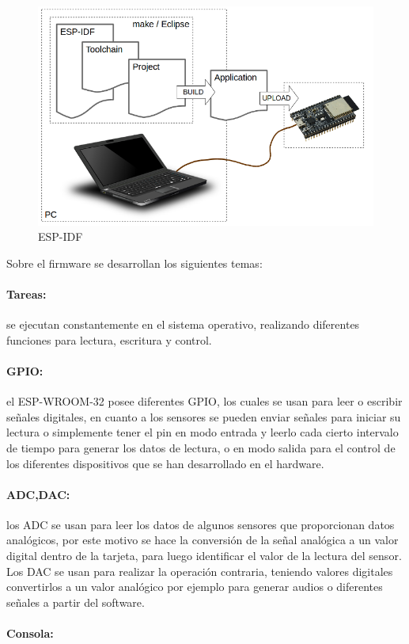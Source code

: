 \begin{figure}[H]
	\centering
	\caption{ESP-IDF \cite{ES}}
	\label{fig:what-you-need}
	\includegraphics[width=0.5\linewidth]{Imagenes/what-you-need}
\end{figure}


Sobre el firmware se desarrollan los siguientes temas:

\paragraph{Tareas:}

se ejecutan constantemente en el sistema operativo, realizando diferentes funciones para lectura, escritura y control.

\paragraph{GPIO:}

el ESP-WROOM-32 posee diferentes GPIO, los cuales se usan para leer o escribir señales digitales, en cuanto a los sensores se pueden enviar señales para iniciar su lectura o simplemente tener el pin en modo entrada y leerlo cada cierto intervalo de tiempo para generar los datos de lectura, o en modo salida para el control de los diferentes dispositivos que se han desarrollado en el hardware.

\paragraph{ADC,DAC:}

los ADC se usan para leer los datos de algunos sensores que proporcionan datos analógicos, por este motivo se hace la conversión de la señal analógica a un valor digital dentro de la tarjeta, para luego identificar el valor de la lectura del sensor. Los DAC se usan para realizar la operación contraria, teniendo valores digitales convertirlos a un valor analógico por ejemplo para generar audios o diferentes señales a partir del software.

\paragraph{Consola:}

